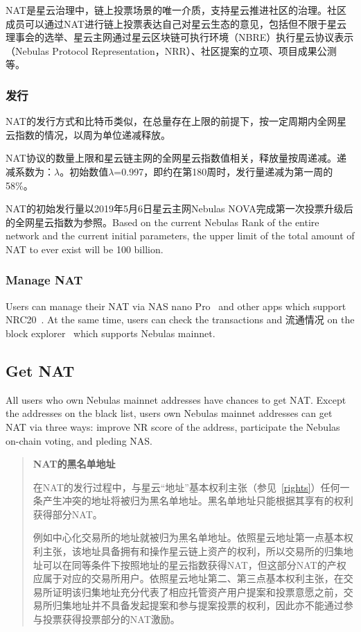 NAT是星云治理中，链上投票场景的唯一介质，支持星云推进社区的治理。社区成员可以通过NAT进行链上投票表达自己对星云生态的意见，包括但不限于星云理事会的选举、星云主网通过星云区块链可执行环境（NBRE）执行星云协议表示（Nebulas Protocol Representation，NRR）、社区提案的立项、项目成果公测等。

\subsubsection{发行}
	
NAT的发行方式和比特币类似，在总量存在上限的前提下，按一定周期内全网星云指数的情况，以周为单位递减释放。

NAT协议的数量上限和星云链主网的全网星云指数值相关，释放量按周递减。递减系数为：$\lambda$。初始数值$\lambda$=0.997，即约在第180周时，发行量递减为第一周的58\%。

NAT的初始发行量以2019年5月6日星云主网Nebulas NOVA完成第一次投票升级后的全网星云指数为参照。Based on the current Nebulas Rank of the entire network and the current initial parameters, the upper limit of the total amount of NAT to ever exist will be 100 billion.

\subsubsection{Manage NAT}

Users can manage their NAT via NAS nano Pro~\cite{NASnano} and other apps which support NRC20~\cite{wallets}. At the same time, users can check the transactions and 流通情况 on the block explorer~\cite{explorer} which supports Nebulas mainnet.

\subsection{Get NAT}

All users who own Nebulas mainnet addresses have chances to get NAT. Except the addresses on the black list, users own Nebulas mainnet addresses can get NAT via three ways: improve NR score of the address, participate the Nebulas on-chain voting, and pleding NAS.

\begin{quotation}

\textbf{NAT的黑名单地址}

在NAT的发行过程中，与星云“地址”基本权利主张（参见~\ref{rights}）任何一条产生冲突的地址将被归为黑名单地址。黑名单地址只能根据其享有的权利获得部分NAT。

例如中心化交易所的地址就被归为黑名单地址。依照星云地址第一点基本权利主张，该地址具备拥有和操作星云链上资产的权利，所以交易所的归集地址可以在同等条件下按照地址的星云指数获得NAT，但这部分NAT的产权应属于对应的交易所用户。依照星云地址第二、第三点基本权利主张，在交易所证明该归集地址充分代表了相应托管资产用户提案和投票意愿之前，交易所归集地址并不具备发起提案和参与提案投票的权利，因此亦不能通过参与投票获得投票部分的NAT激励。

\end{quotation}

